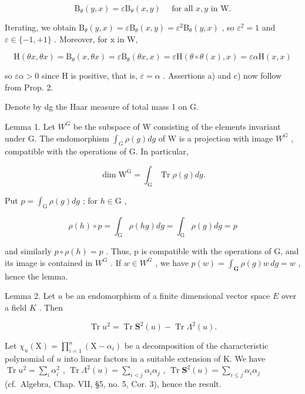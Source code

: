 \[
\mathrm{B} _ {\theta} (y, x) = \varepsilon \mathrm{B} _ {\theta} (x, y) \quad \text { for   all } x, y \text { in } \mathrm{W}.
\]

Iterating, we obtain \(\mathrm{B}_{\theta}(y,x)=\varepsilon\mathrm{B}_{\theta}(x,y)=\varepsilon^{2}\mathrm{B}_{\theta}(y,x)\) , so \(\varepsilon^{2}=1\) and \(\varepsilon\in\{-1,+1\}\) . Moreover, for x in W,

\[
\mathrm{H} (\theta x, \theta x) = \mathrm{B} _ {\theta} (x, \theta x) = \varepsilon \mathrm{B} _ {\theta} (\theta x, x) = \varepsilon \mathrm{H} (\theta \circ \theta (x), x) = \varepsilon \alpha \mathrm{H} (x, x)
\]

so \(\varepsilon\alpha > 0\) since H is positive, that is, \(\varepsilon = \alpha\) . Assertions a) and c) now follow from Prop. 2.

Denote by dg the Haar measure of total mass 1 on G.

Lemma 1. Let \(W^{G}\) be the subspace of W consisting of the elements invariant under G. The endomorphism \(\int_{G}\rho(g)dg\) of W is a projection with image \(W^{G}\) , compatible with the operations of G. In particular,

\[
\dim \mathrm{W} ^ {\mathrm{G}} = \int_ {\mathrm{G}} \operatorname{Tr} \rho (g) d g.
\]

Put \(p = \int_{\mathrm{G}} \rho(g) dg\) ; for \(h \in \mathrm{G}\) ,

\[
\rho (h) \circ p = \int_ {\mathrm{G}} \rho (h g) d g = \int_ {\mathrm{G}} \rho (g) d g = p
\]

and similarly \(p \circ \rho(h) = p\) . Thus, p is compatible with the operations of G, and its image is contained in \(W^{G}\) . If \(w \in W^{G}\) , we have \(p(w) = \int_{\mathbf{G}} \rho(g) w \, dg = w\) , hence the lemma.

Lemma 2. Let \(u\) be an endomorphism of a finite dimensional vector space \(E\) over a field \(K\) . Then

\[
\operatorname{Tr} u ^ {2} = \operatorname{Tr} \mathbf {S} ^ {2} (u) - \operatorname{Tr} \Lambda^ {2} (u).
\]

Let \(\chi_u(\mathrm{X}) = \prod_{i=1}^{n} (\mathrm{X} - \alpha_i)\) be a decomposition of the characteristic polynomial of \(u\) into linear factors in a suitable extension of K. We have \(\operatorname{Tr} u^2 = \sum_i \alpha_i^2\) , \(\operatorname{Tr} \Lambda^2(u) = \sum_{i < j} \alpha_i \alpha_j\) , \(\operatorname{Tr} \mathbf{S}^2(u) = \sum_{i \leq j} \alpha_i \alpha_j\) (cf.~Algebra, Chap. VII, §5, no. 5, Cor. 3), hence the result.

